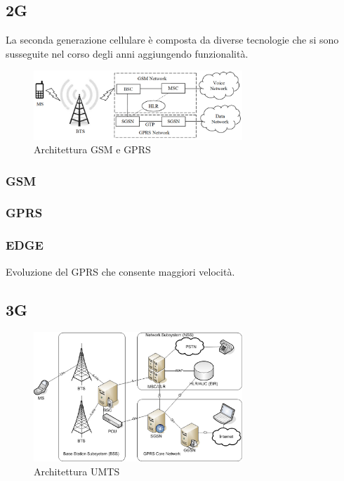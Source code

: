 \subsection{2G}
La seconda generazione cellulare è composta da diverse tecnologie che si sono susseguite nel corso degli anni aggiungendo  
funzionalità.
\begin{figure}[ht]
    \centering
    \includegraphics[width=0.7\textwidth]{images/2g-gsm-gprs.png}
    \caption{Architettura GSM e GPRS}
\end{figure}
\subsubsection{GSM}


\subsubsection{GPRS}


\subsubsection{EDGE}
Evoluzione del GPRS che consente maggiori velocità.

\subsection{3G}
\begin{figure}[ht]
    \centering
    \includegraphics[width=0.7\textwidth]{images/3g-umts.png}
    \caption{Architettura UMTS}
\end{figure}

